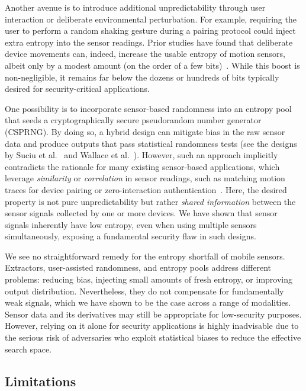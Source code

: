 Another avenue is to introduce additional unpredictability through user interaction or deliberate environmental perturbation. For example, requiring the user to perform a random shaking gesture during a pairing protocol could inject extra entropy into the sensor readings. Prior studies have found that deliberate device movements can, indeed, increase the usable entropy of motion sensors, albeit only by a modest amount (on the order of a few bits)~\cite{voris2011accelerometers,lv2020analysis}. While this boost is non-negligible, it remains far below the dozens or hundreds of bits typically desired for security-critical applications. 

One possibility is to incorporate sensor-based randomness into an entropy pool that seeds a cryptographically secure pseudorandom number generator (CSPRNG). By doing so, a hybrid design can mitigate bias in the raw sensor data and produce outputs that pass statistical randomness tests (see the designs by Suciu et al.~\cite{suciu2011unpredictable} and Wallace et al.~\cite{wallace2016toward}). However, such an approach implicitly contradicts the rationale for many existing sensor-based applications, which leverage \emph{similarity} or \emph{correlation} in sensor readings, such as matching motion traces for device pairing or zero-interaction authentication~\cite{fomichev2019perils,mehrnezhad2015tap,shrestha2014drone,shrestha2018sensor,markantonakis2024using,mayrhofer2009shake}. Here, the desired property is not pure unpredictability but rather \emph{shared information} between the sensor signals collected by one or more devices. We have shown that sensor signals inherently have low entropy, even when using multiple sensors simultaneously, exposing a fundamental security flaw in such designs.

We see no straightforward remedy for the entropy shortfall of mobile sensors. Extractors, user-assisted randomness, and entropy pools address different problems: reducing bias, injecting small amounts of fresh entropy, or improving output distribution. Nevertheless, they do not compensate for fundamentally weak signals, which we have shown to be the case across a range of modalities. Sensor data and its derivatives may still be appropriate for low-security purposes. However, relying on it alone for security applications is highly inadvisable due to the serious risk of adversaries who exploit statistical biases to reduce the effective search space.

\subsection{Limitations}

